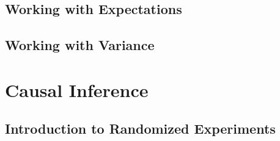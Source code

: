 \subsection{Working with Expectations}

\subsection{Working with Variance}

\newpage
\section{Causal Inference}
\subsection{Introduction to Randomized Experiments}

